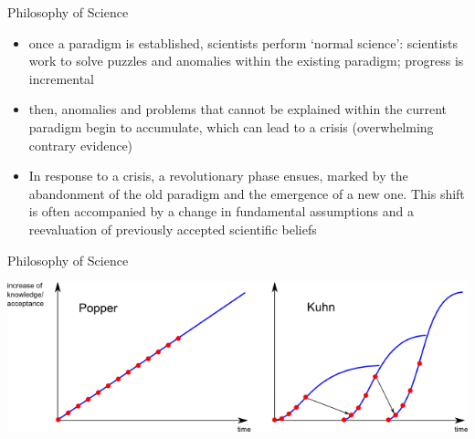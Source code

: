 \documentclass{beamer}
\begin{document}
\begin{frame}{Philosophy of Science}
\begin{itemize}
			\item<3-> once a paradigm is established, scientists perform `normal science': scientists work to solve puzzles and anomalies within the existing paradigm; progress is incremental
			\item<4-> then, anomalies and problems that cannot be explained within the current paradigm begin to accumulate, which can lead to a crisis (overwhelming contrary evidence)
			\item<5-> In response to a crisis, a revolutionary phase ensues, marked by the abandonment of the old paradigm and the emergence of a new one. This shift is often accompanied by a change in fundamental assumptions and a reevaluation of previously accepted scientific beliefs
		\end{itemize}

\end{frame}

\begin{frame}{Philosophy of Science}
	\begin{center}
		\includegraphics[width=1\textwidth]{../images/popper-kuhn1.png}
	\end{center}
\end{frame}
\end{document}
